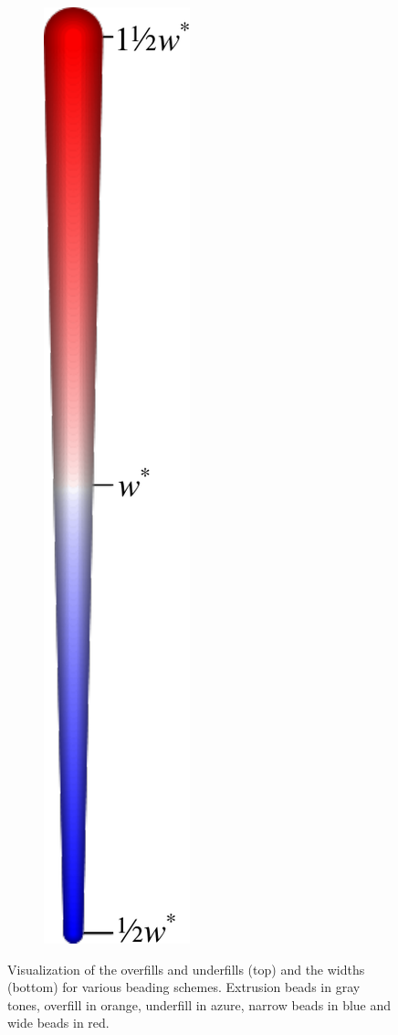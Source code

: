 \begin{figure}
\begin{subfigure}{.04\columnwidth}
\includegraphics[height=\figheight]{sources-validation-gMAT-example-widths-legend.pdf}
\end{subfigure}
\caption{
Visualization of the overfills and underfills (top) and the widths (bottom) for various beading schemes.
Extrusion beads in gray tones,
overfill in orange,
underfill in azure,
narrow beads in blue
and wide beads in red.
}
\label{visualized_accuracy}
\end{figure}




